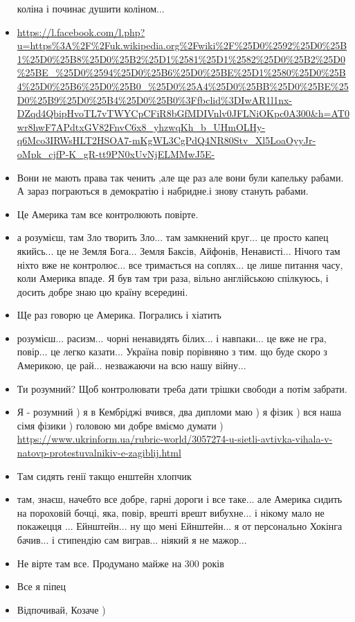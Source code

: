 \begin{itemize}
коліна і починає душити коліном...
\item \url{https://l.facebook.com/l.php?u=https%3A%2F%2Fuk.wikipedia.org%2Fwiki%2F%25D0%2592%25D0%25B1%25D0%25B8%25D0%25B2%25D1%2581%25D1%2582%25D0%25B2%25D0%25BE_%25D0%2594%25D0%25B6%25D0%25BE%25D1%2580%25D0%25B4%25D0%25B6%25D0%25B0_%25D0%25A4%25D0%25BB%25D0%25BE%25D0%25B9%25D0%25B4%25D0%25B0%3Ffbclid%3DIwAR1l1nx-DZqd4QbipHvoTL7vTWYCpCFiR8bGfMDIVnlv0JFLNiOKpc0A300&h=AT0wr8hwF7APdtxGV82FnvC6x8_yhzwqKh_b_UHmOLHy-q6Mco3IRWsHLT2HSOA7-mKgWL3CgPdQ4NR80Stv_Xl5LoaOyyJr-oMpk_cjfP-K_gR-tt9PN0xUvNjELMMwJ5E-}
\item Вони не мають права так ченить ,але ще раз але вони були капельку рабами.
А зараз пограються в демократію і набридне.і знову стануть рабами.
\item Це Америка там все контролюють повірте.
\item а розумієш, там Зло творить Зло... там замкнений круг... це просто капец
				якийсь... це не Земля Бога... Земля Баксів, Айфонів, Ненависті...
				Нічого там ніхто вже не контролює... все тримається на соплях... це
				лише питання часу, коли Америка впаде. Я був там три раза, вільно
				англійською спілкуюсь, і досить добре знаю цю країну всередині.
\item Ще раз говорю це Америка.  Погрались і хіатить
\item розумієш... расизм... чорні ненавидять білих... і навпаки...  це вже не
				гра, повір... це легко казати... Україна повір порівняно з тим. що буде
				скоро з Америкою, це рай... незважаючи на всю нашу війну...
\item Ти розумний?  Щоб контролювати треба дати трішки свободи а потім забрати.
\item Я - розумний ) я в Кембріджі вчився, два дипломи маю ) я фізик ) вся наша
				сімя фізики ) головою ми добре вміємо думати )
				\url{https://www.ukrinform.ua/rubric-world/3057274-u-sietli-avtivka-vihala-v-natovp-protestuvalnikiv-e-zagiblij.html}
\item Там сидять генії такщо енштейн хлопчик
\item там, знаєш, начебто все добре, гарні дороги і все таке... але Америка
сидить на пороховій бочці, яка, повір, врешті врешт вибухне... і нікому
мало не покажецця ...  Ейнштейн... ну що мені Ейнштейн... я от
персонально Хокінга бачив... і стипендію сам виграв... ніякий я не
мажор...
\item Не вірте там все. Продумано майже на 300 років
\item Все я піпец
\item Відпочивай, Козаче )

\end{itemize}
